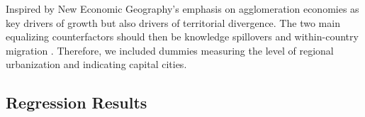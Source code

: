 \documentclass[11pt]{article}
\begin{document}
Inspired by New Economic Geography's emphasis on agglomeration economies as key drivers of growth but also drivers of territorial divergence. The two main equalizing 
counterfactors should then be knowledge spillovers and within-country migration  \citep{iammarino2017regional}. Therefore, we included dummies measuring the level of regional urbanization and indicating capital cities. %

\subsection{Regression Results}


\end{document}
